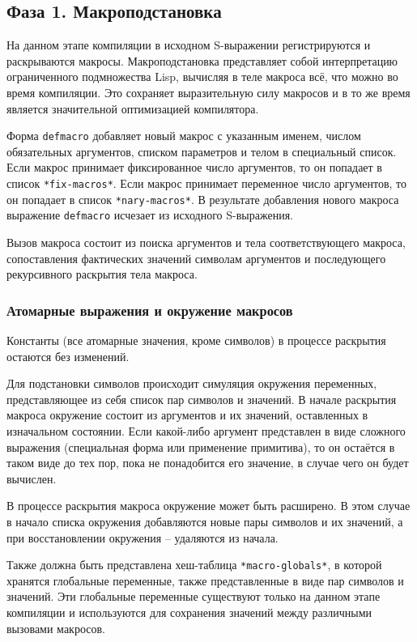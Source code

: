 
\subsection{Фаза 1. Макроподстановка}

На данном этапе компиляции в исходном S-выражении регистрируются и раскрываются макросы. Макроподстановка представляет собой интерпретацию ограниченного подмножества Lisp, вычисляя в теле макроса всё, что можно во время компиляции. Это сохраняет выразительную силу макросов и в то же время является значительной оптимизацией компилятора.

Форма \texttt{defmacro} добавляет новый макрос с указанным именем, числом обязательных аргументов, списком параметров и телом в специальный список. Если макрос принимает фиксированное число аргументов, то он попадает в список \texttt{*fix-macros*}. Если макрос принимает переменное число аргументов, то он попадает в список \texttt{*nary-macros*}. В результате добавления нового макроса выражение \texttt{defmacro} исчезает из исходного S-выражения.

Вызов макроса состоит из поиска аргументов и тела соответствующего макроса, сопоставления фактических значений символам аргументов и последующего рекурсивного раскрытия тела макроса.

\subsubsection{Атомарные выражения и окружение макросов}

Константы (все атомарные значения, кроме символов) в процессе раскрытия остаются без изменений.

Для подстановки символов происходит симуляция окружения переменных, представляющее из себя список пар символов и значений. В начале раскрытия макроса окружение состоит из аргументов и их значений, оставленных в изначальном состоянии. Если какой-либо аргумент представлен в виде сложного выражения (специальная форма или применение примитива), то он остаётся в таком виде до тех пор, пока не понадобится его значение, в случае чего он будет вычислен.

В процессе раскрытия макроса окружение может быть расширено. В этом случае в начало списка окружения добавляются новые пары символов и их значений, а при восстановлении окружения -- удаляются из начала.

Также должна быть представлена хеш-таблица \texttt{*macro-globals*}, в которой хранятся глобальные переменные, также представленные в виде пар символов и значений. Эти глобальные переменные существуют только на данном этапе компиляции и используются для сохранения значений между различными вызовами макросов.

